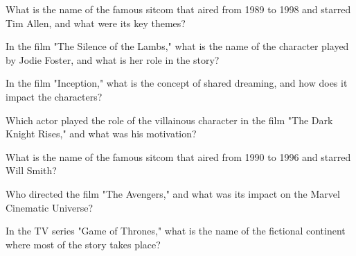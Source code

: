 \documentclass[12pt,a4paper]{book}
\begin{document}
\begin{enhancedmcq}[Question 14]{What is the name of the famous sitcom that aired from 1989 to 1998 and starred Tim Allen, and what were its key themes?}
\end{enhancedmcq}

\begin{enhancedmcq}[Question 15]{In the film "The Silence of the Lambs," what is the name of the character played by Jodie Foster, and what is her role in the story?}
\end{enhancedmcq}

\begin{enhancedmcq}[Question 16]{In the film "Inception," what is the concept of shared dreaming, and how does it impact the characters?}
\end{enhancedmcq}

\begin{enhancedmcq}[Question 17]{Which actor played the role of the villainous character in the film "The Dark Knight Rises," and what was his motivation?}
\end{enhancedmcq}

\begin{enhancedmcq}[Question 18]{What is the name of the famous sitcom that aired from 1990 to 1996 and starred Will Smith?}
\end{enhancedmcq}

\begin{enhancedmcq}[Question 19]{Who directed the film "The Avengers," and what was its impact on the Marvel Cinematic Universe?}
\end{enhancedmcq}

\begin{enhancedmcq}[Question 20]{In the TV series "Game of Thrones," what is the name of the fictional continent where most of the story takes place?}
\end{enhancedmcq}
\end{document}
